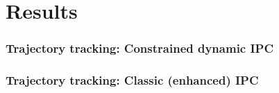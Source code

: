 \documentclass[student]{ITRslides}
\begin{document}
\section{Results}
%
\begin{frame}
	\frametitle{Trajectory tracking: Constrained dynamic IPC }
	\vspace{-30pt}
	\begin{figure}
%

\end{figure}
\end{frame}


\begin{frame}
	\frametitle{Trajectory tracking: Classic (enhanced) IPC }
	\vspace{-30pt}
	\begin{figure}
%

\end{figure}
\end{frame}

%	
%	
\end{document}
